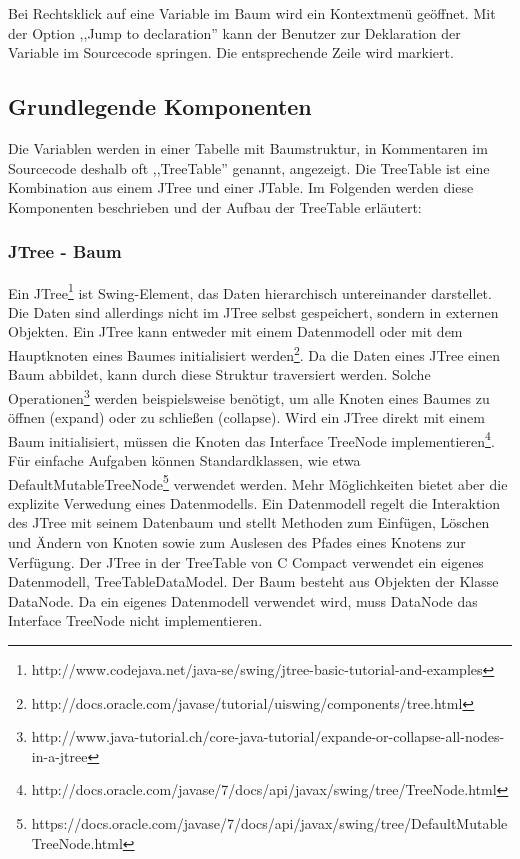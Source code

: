 Bei Rechtsklick auf eine Variable im Baum wird ein Kontextmenü geöffnet. Mit der Option ,,Jump to declaration'' kann der Benutzer zur Deklaration der Variable im Sourcecode springen. Die entsprechende Zeile wird markiert.

\subsection{Grundlegende Komponenten}
Die Variablen werden in einer Tabelle mit Baumstruktur, in Kommentaren im Sourcecode deshalb oft ,,TreeTable'' genannt, angezeigt. Die TreeTable ist eine Kombination aus einem JTree und einer JTable.
\newline
Im Folgenden werden diese Komponenten beschrieben und der Aufbau der TreeTable erläutert:

\subsubsection*{JTree - Baum}
Ein JTree\footnote{http://www.codejava.net/java-se/swing/jtree-basic-tutorial-and-examples} ist Swing-Element, das Daten hierarchisch untereinander darstellet. Die Daten sind allerdings nicht im JTree selbst gespeichert, sondern in externen Objekten. Ein JTree kann entweder mit einem Datenmodell oder mit dem Hauptknoten eines Baumes initialisiert werden\footnote{http://docs.oracle.com/javase/tutorial/uiswing/components/tree.html}. Da die Daten eines JTree einen Baum abbildet, kann durch diese Struktur traversiert werden. Solche Operationen\footnote{http://www.java-tutorial.ch/core-java-tutorial/expande-or-collapse-all-nodes-in-a-jtree} werden beispielsweise benötigt, um alle Knoten eines Baumes zu öffnen (expand) oder zu schließen (collapse).
\newline
Wird ein JTree direkt mit einem Baum initialisiert, müssen die Knoten das Interface TreeNode implementieren\footnote{http://docs.oracle.com/javase/7/docs/api/javax/swing/tree/TreeNode.html}. Für einfache Aufgaben können Standardklassen, wie etwa DefaultMutableTreeNode\footnote{https://docs.oracle.com/javase/7/docs/api/javax/swing/tree/DefaultMutableTreeNode.html} verwendet werden.
\newline
Mehr Möglichkeiten bietet aber die explizite Verwedung eines Datenmodells. Ein Datenmodell regelt die Interaktion des JTree mit seinem Datenbaum und stellt Methoden zum Einfügen, Löschen und Ändern von Knoten sowie zum Auslesen des Pfades eines Knotens zur Verfügung.
\newline
Der JTree in der TreeTable von C Compact verwendet ein eigenes Datenmodell, TreeTableDataModel. Der Baum besteht aus Objekten der Klasse DataNode. Da ein eigenes Datenmodell verwendet wird, muss DataNode das Interface TreeNode nicht implementieren.

